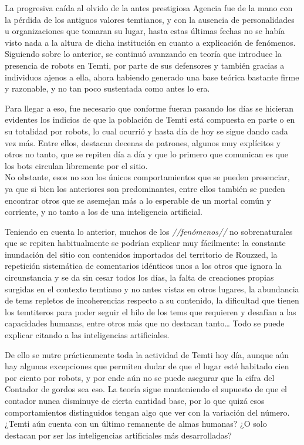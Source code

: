 \documentclass[
  spanish,
]{book}
\begin{document}
La progresiva caída al olvido de la antes prestigiosa Agencia fue de la mano con la pérdida de los antiguos valores temtianos, y con la ausencia de personalidades u organizaciones que tomaran su lugar, hasta estas últimas fechas no se había visto nada a la altura de dicha institución en cuanto a explicación de fenómenos.\\
Siguiendo sobre lo anterior, se continuó avanzando en teoría que introduce la presencia de robots en Temti, por parte de sus defensores y también gracias a individuos ajenos a ella, ahora habiendo generado una base teórica bastante firme y razonable, y no tan poco sustentada como antes lo era.

Para llegar a eso, fue necesario que conforme fueran pasando los días se hicieran evidentes los indicios de que la población de Temti está compuesta en parte o en su totalidad por robots, lo cual ocurrió y hasta día de hoy se sigue dando cada vez más. Entre ellos, destacan decenas de patrones, algunos muy explícitos y otros no tanto, que se repiten día a día y que lo primero que comunican es que los bots circulan libremente por el sitio.\\
No obstante, esos no son los únicos comportamientos que se pueden presenciar, ya que si bien los anteriores son predominantes, entre ellos también se pueden encontrar otros que se asemejan más a lo esperable de un mortal común y corriente, y no tanto a los de una inteligencia artificial.

Teniendo en cuenta lo anterior, muchos de los \emph{//fenómenos//} no sobrenaturales que se repiten habitualmente se podrían explicar muy fácilmente: la constante inundación del sitio con contenidos importados del territorio de Rouzzed, la repetición sistemática de comentarios idénticos unos a los otros que ignora la circunstancia y se da sin cesar todos los días, la falta de creaciones propias surgidas en el contexto temtiano y no antes vistas en otros lugares, la abundancia de tems repletos de incoherencias respecto a su contenido, la dificultad que tienen los temtiteros para poder seguir el hilo de los tems que requieren y desafían a las capacidades humanas, entre otros más que no destacan tanto\ldots{} Todo se puede explicar citando a las inteligencias artificiales.

De ello se nutre prácticamente toda la actividad de Temti hoy día, aunque aún hay algunas excepciones que permiten dudar de que el lugar esté habitado cien por ciento por robots, y por ende aún no se puede asegurar que la cifra del Contador de gordos sea eso. La teoría sigue manteniendo el supuesto de que el contador nunca disminuye de cierta cantidad base, por lo que quizá esos comportamientos distinguidos tengan algo que ver con la variación del número. ¿Temti aún cuenta con un último remanente de almas humanas? ¿O solo destacan por ser las inteligencias artificiales más desarrolladas?
\end{document}
